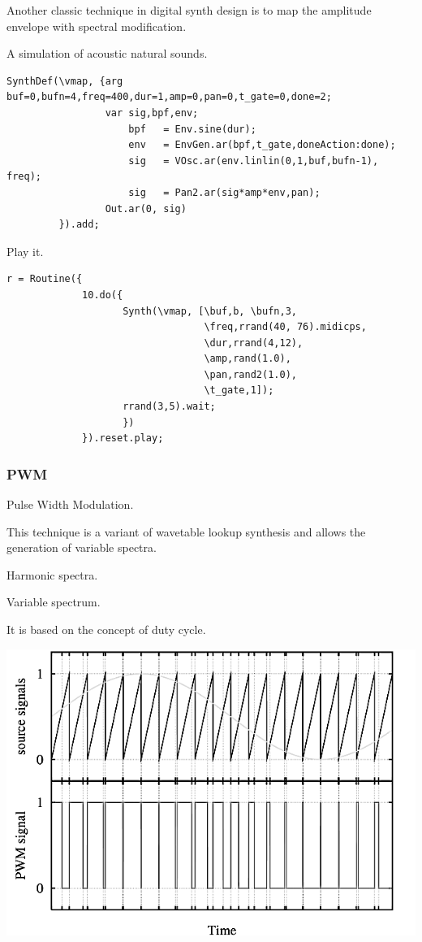 Another classic technique in digital synth design is to map the amplitude envelope with spectral modification.

A simulation of acoustic natural sounds.

\begin{lstlisting}[frame=single,caption=Envelope mapping parameter] 
SynthDef(\vmap, {arg buf=0,bufn=4,freq=400,dur=1,amp=0,pan=0,t_gate=0,done=2;
                 var sig,bpf,env;
                     bpf   = Env.sine(dur);
                     env   = EnvGen.ar(bpf,t_gate,doneAction:done);
                     sig   = VOsc.ar(env.linlin(0,1,buf,bufn-1), freq);
                     sig   = Pan2.ar(sig*amp*env,pan);
                 Out.ar(0, sig)
         }).add;
\end{lstlisting}

Play it.

\begin{lstlisting}[frame=single] 
r = Routine({
             10.do({
                    Synth(\vmap, [\buf,b, \bufn,3,
                                  \freq,rrand(40, 76).midicps,
                                  \dur,rrand(4,12),
                                  \amp,rand(1.0),
                                  \pan,rand2(1.0),
                                  \t_gate,1]);
                    rrand(3,5).wait;
                    })
             }).reset.play;
\end{lstlisting}

\subsubsection{PWM}\label{pwm}

Pulse Width Modulation.

This technique is a variant of wavetable lookup synthesis and allows the generation of variable spectra.

Harmonic spectra.

Variable spectrum.

It is based on the concept of duty cycle.

\begin{center}
\includegraphics[scale=0.7]{../img/pwm.png}
\end{center}

